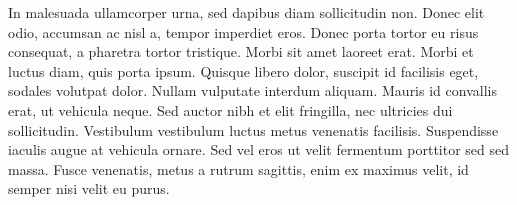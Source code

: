 \documentclass{article}
\begin{document}
In malesuada ullamcorper urna, sed dapibus diam sollicitudin non. Donec elit odio, accumsan ac nisl a, tempor imperdiet eros. Donec porta tortor eu risus consequat, a pharetra tortor tristique. Morbi sit amet laoreet erat. Morbi et luctus diam, quis porta ipsum. Quisque libero dolor, suscipit id facilisis eget, sodales volutpat dolor. Nullam vulputate interdum aliquam. Mauris id convallis erat, ut vehicula neque. Sed auctor nibh et elit fringilla, nec ultricies dui sollicitudin. Vestibulum vestibulum luctus metus venenatis facilisis. Suspendisse iaculis augue at vehicula ornare. Sed vel eros ut velit fermentum porttitor sed sed massa. Fusce venenatis, metus a rutrum sagittis, enim ex maximus velit, id semper nisi velit eu purus.
\end{document}
